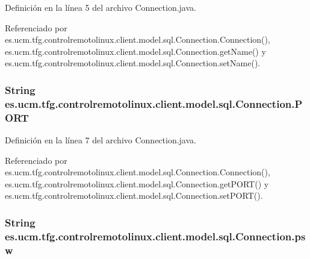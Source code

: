Definición en la línea 5 del archivo Connection.\-java.



Referenciado por es.\-ucm.\-tfg.\-controlremotolinux.\-client.\-model.\-sql.\-Connection.\-Connection(), es.\-ucm.\-tfg.\-controlremotolinux.\-client.\-model.\-sql.\-Connection.\-get\-Name() y es.\-ucm.\-tfg.\-controlremotolinux.\-client.\-model.\-sql.\-Connection.\-set\-Name().

\hypertarget{classes_1_1ucm_1_1tfg_1_1controlremotolinux_1_1client_1_1model_1_1sql_1_1Connection_a8353d2279c18f5d32e4c0b1962c86bd7}{
\subsubsection[{P\-O\-R\-T}]{\setlength{\rightskip}{0pt plus 5cm}String es.\-ucm.\-tfg.\-controlremotolinux.\-client.\-model.\-sql.\-Connection.\-P\-O\-R\-T\hspace{0.3cm}{\ttfamily [private]}}}\label{classes_1_1ucm_1_1tfg_1_1controlremotolinux_1_1client_1_1model_1_1sql_1_1Connection_a8353d2279c18f5d32e4c0b1962c86bd7}


Definición en la línea 7 del archivo Connection.\-java.



Referenciado por es.\-ucm.\-tfg.\-controlremotolinux.\-client.\-model.\-sql.\-Connection.\-Connection(), es.\-ucm.\-tfg.\-controlremotolinux.\-client.\-model.\-sql.\-Connection.\-get\-P\-O\-R\-T() y es.\-ucm.\-tfg.\-controlremotolinux.\-client.\-model.\-sql.\-Connection.\-set\-P\-O\-R\-T().

\hypertarget{classes_1_1ucm_1_1tfg_1_1controlremotolinux_1_1client_1_1model_1_1sql_1_1Connection_aa4ddf94e321302e538523e1ab50e8ed1}{
\subsubsection[{psw}]{\setlength{\rightskip}{0pt plus 5cm}String es.\-ucm.\-tfg.\-controlremotolinux.\-client.\-model.\-sql.\-Connection.\-psw\hspace{0.3cm}{\ttfamily [private]}}}\label{classes_1_1ucm_1_1tfg_1_1controlremotolinux_1_1client_1_1model_1_1sql_1_1Connection_aa4ddf94e321302e538523e1ab50e8ed1}


